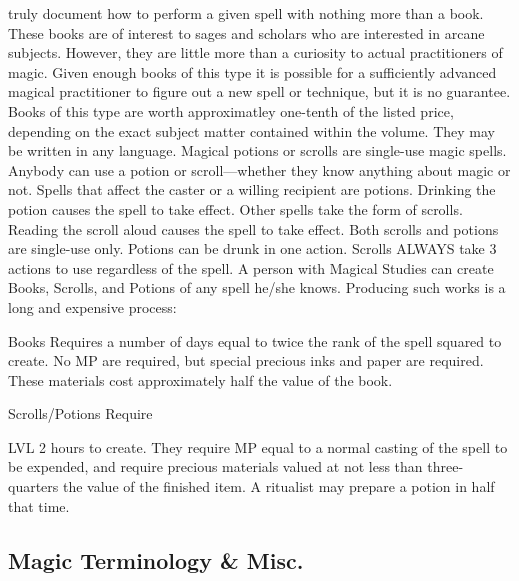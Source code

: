 \documentclass[twoside]{book}
\begin{document}
               truly document how to perform a given spell with nothing
               more than a book. These books are of interest to sages and
               scholars who are interested in arcane subjects. However,
               they are little more than a curiosity to actual
               practitioners of magic. Given enough books of this type it
               is possible for a sufficiently advanced magical
               practitioner to figure out a new spell or technique, but
               it is no guarantee. Books of this type are worth
               approximatley one-tenth of the listed price, depending on
               the exact subject matter contained within the volume. They
               may be written in any language.   Magical potions or scrolls are single-use magic
               spells. Anybody can use a potion or scroll—whether
               they know anything about magic or not. Spells that affect
               the caster or a willing recipient are potions. Drinking
               the potion causes the spell to take effect. Other spells
               take the form of scrolls. Reading the scroll aloud causes
               the spell to take effect. Both scrolls and potions are
               single-use only. Potions can be drunk in one action.
               Scrolls ALWAYS take 3 actions to use regardless of the
               spell.   A person with Magical Studies can create Books,
               Scrolls, and Potions of any spell he/she knows. Producing
               such works is a long and expensive process:   
              
                  Books   Requires a number of
                  days equal to twice the rank of the spell squared to
                  create. No MP are required, but special precious inks
                  and paper are required. These materials cost
                  approximately half the value of the book.
                
              
                   Scrolls/Potions   Require
                     
                       LVL  2 
                        hours       to create.
                      They require MP equal to a normal casting of the
                      spell to be expended, and require precious
                      materials valued at not less than three-quarters
                      the value of the finished item. A ritualist may
                      prepare a potion in half that time.
                
            
\subsection{Magic Terminology \& Misc.}
      
\end{document}
